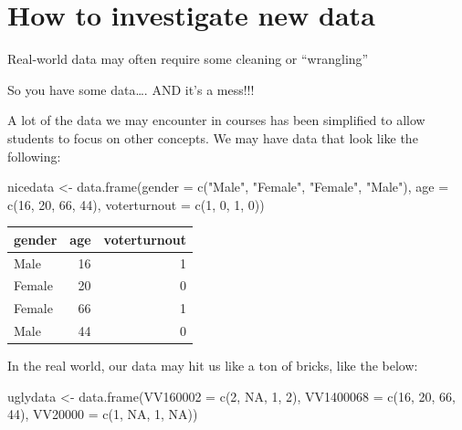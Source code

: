 \documentclass[
  letterpaper,
  DIV=11,
  numbers=noendperiod]{scrreprt}
\newenvironment{Shaded}{\begin{snugshade}}{\end{snugshade}}
\newcommand{\AttributeTok}[1]{\textcolor[rgb]{0.40,0.45,0.13}{#1}}
\newcommand{\ConstantTok}[1]{\textcolor[rgb]{0.56,0.35,0.01}{#1}}
\newcommand{\DecValTok}[1]{\textcolor[rgb]{0.68,0.00,0.00}{#1}}
\newcommand{\FunctionTok}[1]{\textcolor[rgb]{0.28,0.35,0.67}{#1}}
\newcommand{\NormalTok}[1]{\textcolor[rgb]{0.00,0.23,0.31}{#1}}
\newcommand{\OtherTok}[1]{\textcolor[rgb]{0.00,0.23,0.31}{#1}}
\newcommand{\StringTok}[1]{\textcolor[rgb]{0.13,0.47,0.30}{#1}}
\begin{document}
\hypertarget{how-to-investigate-new-data}{%
\section{How to investigate new
data}\label{how-to-investigate-new-data}}

Real-world data may often require some cleaning or ``wrangling''

So you have some data\ldots. AND it's a mess!!!

A lot of the data we may encounter in courses has been simplified to
allow students to focus on other concepts. We may have data that look
like the following:

\begin{Shaded}
\begin{Highlighting}[]
\NormalTok{nicedata }\OtherTok{\textless{}{-}} \FunctionTok{data.frame}\NormalTok{(}\AttributeTok{gender =} \FunctionTok{c}\NormalTok{(}\StringTok{"Male"}\NormalTok{, }\StringTok{"Female"}\NormalTok{, }\StringTok{"Female"}\NormalTok{, }\StringTok{"Male"}\NormalTok{),}
           \AttributeTok{age =} \FunctionTok{c}\NormalTok{(}\DecValTok{16}\NormalTok{, }\DecValTok{20}\NormalTok{, }\DecValTok{66}\NormalTok{, }\DecValTok{44}\NormalTok{),}
           \AttributeTok{voterturnout =} \FunctionTok{c}\NormalTok{(}\DecValTok{1}\NormalTok{, }\DecValTok{0}\NormalTok{, }\DecValTok{1}\NormalTok{, }\DecValTok{0}\NormalTok{))}
\end{Highlighting}
\end{Shaded}

\begin{longtable}[]{@{}lrr@{}}
\toprule\noalign{}
gender & age & voterturnout \\
\midrule\noalign{}
\endhead
\bottomrule\noalign{}
\endlastfoot
Male & 16 & 1 \\
Female & 20 & 0 \\
Female & 66 & 1 \\
Male & 44 & 0 \\
\end{longtable}

In the real world, our data may hit us like a ton of bricks, like the
below:

\begin{Shaded}
\begin{Highlighting}[]
\NormalTok{uglydata }\OtherTok{\textless{}{-}} \FunctionTok{data.frame}\NormalTok{(}\AttributeTok{VV160002 =} \FunctionTok{c}\NormalTok{(}\DecValTok{2}\NormalTok{, }\ConstantTok{NA}\NormalTok{, }\DecValTok{1}\NormalTok{, }\DecValTok{2}\NormalTok{),}
           \AttributeTok{VV1400068 =} \FunctionTok{c}\NormalTok{(}\DecValTok{16}\NormalTok{, }\DecValTok{20}\NormalTok{, }\DecValTok{66}\NormalTok{, }\DecValTok{44}\NormalTok{),}
           \AttributeTok{VV20000 =} \FunctionTok{c}\NormalTok{(}\DecValTok{1}\NormalTok{, }\ConstantTok{NA}\NormalTok{, }\DecValTok{1}\NormalTok{, }\ConstantTok{NA}\NormalTok{))}
\end{Highlighting}
\end{Shaded}
\end{document}

